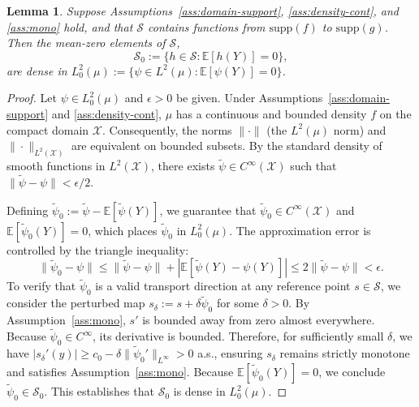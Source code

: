 \documentclass[12pt,leqno]{amsart}
\newtheorem{lemma}{Lemma}
\begin{document}
\begin{lemma}\label{lem:density-mean-zero}
Suppose Assumptions~\ref{ass:domain-support}, \ref{ass:density-cont}, and \ref{ass:mono} hold, and that $\mathcal{S}$ contains functions from $\mathrm{supp}(f)$ to $\mathrm{supp}(g)$. Then the mean-zero elements of $\mathcal{S}$, 
\[ \mathcal{S}_0 := \{h \in \mathcal{S} : \mathbb{E}[h(Y)] = 0\}, \]
are dense in $L^2_0(\mu) := \{\psi \in L^2(\mu) : \mathbb{E}[\psi(Y)] = 0\}$.
\end{lemma}
\begin{proof}
Let $\psi \in L^2_0(\mu)$ and $\epsilon > 0$ be given. Under Assumptions~\ref{ass:domain-support} and \ref{ass:density-cont}, $\mu$ has a continuous and bounded density $f$ on the compact domain $\mathcal{X}$. Consequently, the norms $\|\cdot\|$ (the $L^2(\mu)$ norm) and $\|\cdot\|_{L^2(\mathcal{X})}$ are equivalent on bounded subsets. By the standard density of smooth functions in $L^2(\mathcal{X})$, there exists $\tilde{\psi} \in C^\infty(\mathcal{X})$ such that $\|\tilde{\psi} - \psi\| < \epsilon/2$.

Defining $\tilde{\psi}_0 := \tilde{\psi} - \mathbb{E}[\tilde{\psi}(Y)]$, we guarantee that $\tilde{\psi}_0 \in C^\infty(\mathcal{X})$ and $\mathbb{E}[\tilde{\psi}_0(Y)] = 0$, which places $\tilde{\psi}_0$ in $L^2_0(\mu)$. The approximation error is controlled by the triangle inequality:
\[
\|\tilde{\psi}_0 - \psi\| \le \|\tilde{\psi} - \psi\| + |\mathbb{E}[\tilde{\psi}(Y) - \psi(Y)]| \le 2\|\tilde{\psi} - \psi\| < \epsilon.
\]
To verify that $\tilde{\psi}_0$ is a valid transport direction at any reference point $s\in\mathcal{S}$, we consider the perturbed map $s_\delta := s + \delta \tilde{\psi}_0$ for some $\delta > 0$. By Assumption~\ref{ass:mono}, $s'$ is bounded away from zero almost everywhere. Because $\tilde{\psi}_0 \in C^\infty$, its derivative is bounded. Therefore, for sufficiently small $\delta$, we have $|s_\delta'(y)| \ge c_0 - \delta\|\tilde{\psi}_0'\|_{L^\infty} > 0$ a.s., ensuring $s_\delta$ remains strictly monotone and satisfies Assumption~\ref{ass:mono}. Because $\mathbb{E}[\tilde{\psi}_0(Y)]=0$, we conclude $\tilde{\psi}_0 \in \mathcal{S}_0$. This establishes that $\mathcal{S}_0$ is dense in $L^2_0(\mu)$.
\end{proof}
\end{document}
